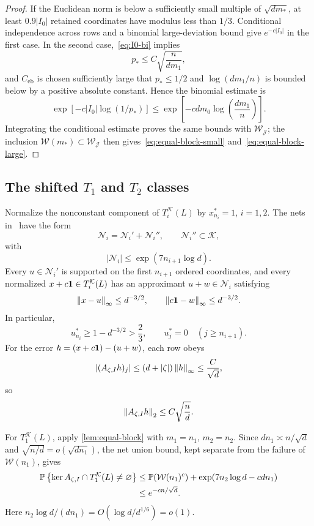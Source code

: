\begin{proof}
If the Euclidean norm is below a sufficiently small multiple of $\sqrt{dm_*}$, at least $0.9|I_0|$ retained coordinates have modulus less than $1/3$. Conditional independence across rows and a binomial large-deviation bound give $e^{-c|I_0|}$ in the first case. In the second case,~\eqref{eq:I0-bi} implies
\[
  p_*\le C\sqrt{\frac n{dm_1}},
\]
and $C_{\mathrm{eb}}$ is chosen sufficiently large that $p_*\le1/2$ and $\log(dm_1/n)$ is bounded below by a positive absolute constant. Hence the binomial estimate is
\[
  \exp[-c|I_0|\log(1/p_*)]
  \le\exp\left[-cdm_0\log\left(\frac{dm_1}{n}\right)\right].
\]
Integrating the conditional estimate proves the same bounds with $\mathcal W_{\mathscr J}$; the inclusion $\mathcal W(m_*)\subset\mathcal W_{\mathscr J}$ then gives~\eqref{eq:equal-block-small} and~\eqref{eq:equal-block-large}.
\end{proof}

\subsection{\texorpdfstring{The shifted $T_1$ and $T_2$ classes}{The shifted T1 and T2 classes}}\label{subsec:shifted-T1T2}

Normalize the nonconstant component of $T_i^{\mathcal K}(L)$ by $x_{n_i}^*=1$, $i=1,2$. The nets in~\cite[Lemma~4.5]{LLTTY19} have the form
\[
  \mathcal N_i=\mathcal N_i'+\mathcal N_i'',
  \qquad
  \mathcal N_i''\subset\mathcal K,
\]
with
\begin{equation}\label{eq:shifted-net-size}
  |\mathcal N_i|\le\exp(7n_{i+1}\log d).
\end{equation}
Every $u\in\mathcal N_i'$ is supported on the first $n_{i+1}$ ordered coordinates, and every normalized $x+c\mathbf 1\in T_i^{\mathcal K}(L)$ has an approximant $u+w\in\mathcal N_i$ satisfying
\begin{equation}\label{eq:shifted-net-error}
  \left\|x-u\right\|_\infty\le d^{-3/2},
  \qquad
  \left\|c\mathbf 1-w\right\|_\infty\le d^{-3/2}.
\end{equation}
In particular,
\[
  u_{n_i}^*\ge1-d^{-3/2}>\frac23,
  \qquad
  u_j^*=0\quad(j\ge n_{i+1}).
\]
For the error $h=(x+c\mathbf 1)-(u+w)$, each row obeys
\[
  |(A_{\zeta,I}h)_j|
  \le(d+|\zeta|)\left\|h\right\|_\infty
  \le\frac C{\sqrt d},
\]
so
\begin{equation}\label{eq:shifted-net-matrix-error}
  \left\|A_{\zeta,I}h\right\|_2\le C\sqrt{\frac nd}.
\end{equation}

For $T_1^{\mathcal K}(L)$, apply 
\cref{lem:equal-block} with $m_1=n_1$, $m_2=n_2$. Since $dn_1\asymp n/\sqrt d$ and $\sqrt{n/d}=o(\sqrt{dn_1})$, the net union bound, kept separate from the failure of $\mathcal W(n_1)$, gives
\begin{align}
  \mathbb P\left\{\ker A_{\zeta,I}\cap T_1^{\mathcal K}(L)\ne\varnothing\right\}
  &\le\mathbb P(\mathcal W(n_1)^c)+\exp(7n_2\log d-cdn_1)\notag\\
  &\le e^{-cn/\sqrt d}.
  \label{eq:T1-exclusion}
\end{align}
Here $n_2\log d/(dn_1)=O(\log d/d^{1/6})=o(1)$.

